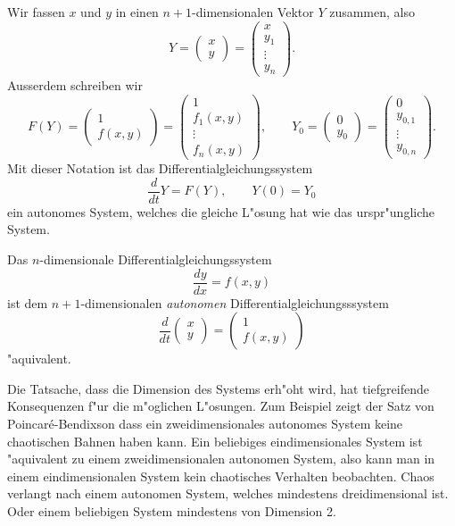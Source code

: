Wir fassen $x$ und $y$ in einen $n+1$-dimensionalen Vektor $Y$ zusammen,
also
\[
Y
=
\begin{pmatrix}x\\y\end{pmatrix}
=
\begin{pmatrix}x\\y_1\\\vdots\\y_n\end{pmatrix}.
\]
Ausserdem schreiben wir
\[
F(Y)
=
\begin{pmatrix}1\\f(x,y)\end{pmatrix}
=
\begin{pmatrix}1\\f_1(x,y)\\\vdots\\f_n(x,y)\end{pmatrix},
\qquad
Y_0
=
\begin{pmatrix}0\\y_0\end{pmatrix}
=
\begin{pmatrix}0\\y_{0,1}\\\vdots\\y_{0,n}\end{pmatrix}.
\]
Mit dieser Notation ist das Differentialgleichungssystem
\[
\frac{d}{dt}Y=F(Y),\qquad Y(0)=Y_0
\]
ein autonomes System, welches die gleiche L"osung hat wie das
urspr"ungliche System.

\begin{satz}
Das $n$-dimensionale Differentialgleichungssystem 
\[
\frac{dy}{dx}=f(x,y)
\]
ist dem $n+1$-dimensionalen {\em autonomen} Differentialgleichungsssystem
\[
\frac{d}{dt}
\begin{pmatrix}
x\\y
\end{pmatrix}
=
\begin{pmatrix}1\\f(x,y)\end{pmatrix}
\]
"aquivalent.
\end{satz}

Die Tatsache, dass die Dimension des Systems erh"oht wird, hat tiefgreifende
Konsequenzen f"ur die m"oglichen L"osungen.
Zum Beispiel zeigt der Satz von Poincar\'e-Bendixson dass ein zweidimensionales
autonomes System keine chaotischen Bahnen haben kann.
Ein beliebiges eindimensionales System ist "aquivalent zu einem
zweidimensionalen autonomen System, also kann man in einem eindimensionalen
System kein chaotisches Verhalten beobachten.
Chaos verlangt nach einem autonomen System, welches mindestens dreidimensional
ist.
Oder einem beliebigen System mindestens von Dimension 2.

